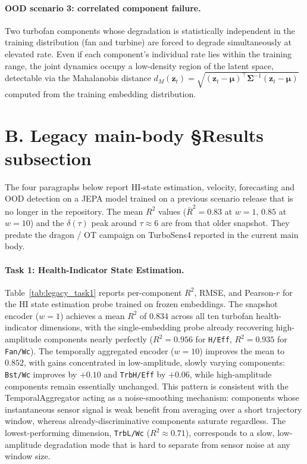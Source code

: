 \paragraph{OOD scenario 3: correlated component failure.}
Two turbofan components whose degradation is statistically independent in
the training distribution (fan and turbine) are forced to degrade
simultaneously at elevated rate.
Even if each component's individual rate lies within the training range,
the joint dynamics occupy a low-density region of the latent space,
detectable via the Mahalanobis distance
$d_M(\mathbf{z}_t) = \sqrt{(\mathbf{z}_t - \boldsymbol{\mu})^\top
                     \boldsymbol{\Sigma}^{-1}
                     (\mathbf{z}_t - \boldsymbol{\mu})}$
computed from the training embedding distribution.


\section*{B. Legacy main-body §Results subsection}

The four paragraphs below report HI-state estimation, velocity, forecasting
and OOD detection on a JEPA model trained on a previous scenario release
that is no longer in the repository. The mean $R^2$ values
($\bar R^2 = 0.83$ at $w{=}1$, $0.85$ at $w{=}10$) and the $\delta(\tau)$
peak around $\tau \approx 6$ are from that older snapshot. They predate
the dragon / OT campaign on TurboSens4 reported in the current main body.

\paragraph{Task 1: Health-Indicator State Estimation.}
Table~\ref{tab:legacy_task1} reports per-component $R^2$, RMSE, and Pearson-$r$ for the HI state estimation probe trained on frozen embeddings.
The snapshot encoder ($w{=}1$) achieves a mean $R^2$ of $0.834$ across all ten turbofan health-indicator dimensions, with the single-embedding probe already recovering high-amplitude components nearly perfectly ($R^2 = 0.956$ for \texttt{H/Eff}, $R^2 = 0.935$ for \texttt{Fan/Wc}).
The temporally aggregated encoder ($w{=}10$) improves the mean to $0.852$, with gains concentrated in low-amplitude, slowly varying components: \texttt{Bst/Wc} improves by $+0.10$ and \texttt{TrbH/Eff} by $+0.06$, while high-amplitude components remain essentially unchanged.
This pattern is consistent with the TemporalAggregator acting as a noise-smoothing mechanism: components whose instantaneous sensor signal is weak benefit from averaging over a short trajectory window, whereas already-discriminative components saturate regardless. The lowest-performing dimension, \texttt{TrbL/Wc} ($R^2 \approx 0.71$), corresponds to a slow, low-amplitude degradation mode that is hard to separate from sensor noise at any window size.

